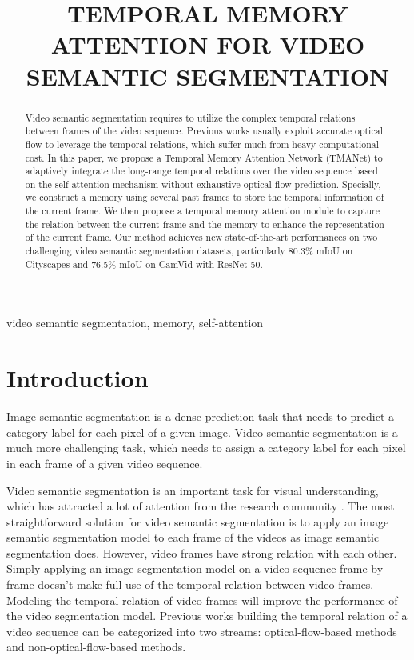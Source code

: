 \documentclass{article}
\title{TEMPORAL MEMORY ATTENTION FOR VIDEO SEMANTIC SEGMENTATION}
\begin{document}
\maketitle
\begin{abstract}
		


		Video semantic segmentation requires to utilize the complex temporal relations between  frames of the video sequence. Previous works usually exploit accurate optical flow to leverage the temporal relations, which suffer much from heavy computational cost. In this paper, we propose a Temporal Memory Attention Network (TMANet) to adaptively integrate the long-range temporal relations over the video sequence based on the self-attention mechanism without exhaustive optical flow prediction. Specially, we construct a memory using several past frames to store the temporal information of the current frame. We then propose a temporal memory attention module to capture the relation between the current frame and the memory to enhance the representation of the current frame. Our method achieves new state-of-the-art performances on two challenging video semantic segmentation datasets, particularly 80.3\% mIoU on Cityscapes and 76.5\% mIoU on CamVid with ResNet-50.
		
	\end{abstract}
\begin{keywords} video semantic segmentation, memory, self-attention
	\end{keywords}
\section{Introduction}
	\label{sec:intro}
Image semantic segmentation is a dense prediction task that needs to predict a category label for each pixel of a given image.  Video semantic segmentation is a much more challenging task, which needs to assign a category label for each pixel in each frame of a given video sequence. 
	
Video semantic segmentation is an important task for visual understanding, which has attracted a lot of attention from the research community \cite{CLK2016, DFF2017, LVS2018, TDNet2019}. The most straightforward solution for video semantic segmentation is to apply an image semantic segmentation model to each frame of the videos as image semantic segmentation does. However, video frames have strong relation with each other. Simply applying an image segmentation model on a video sequence frame by frame doesn't make full use of the temporal relation between video frames. 
	Modeling the temporal relation of video frames  will improve the performance of the video segmentation model. 
	Previous works building the temporal relation of a video sequence can be categorized into two streams: optical-flow-based methods and non-optical-flow-based methods.
	
\end{document}
